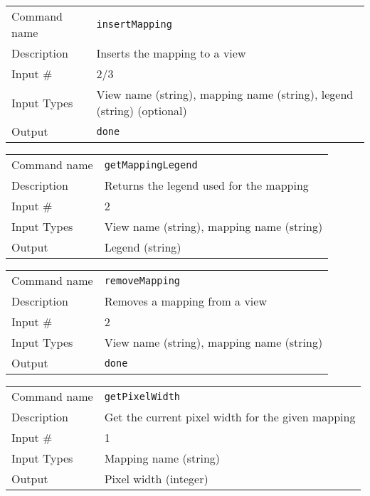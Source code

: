\bigskip

\noindent
\begin{tabular}{l|p{5in}}
\hline
Command name & {\tt insertMapping} \\
Description  & Inserts the mapping to a view \\
Input \#     & 2/3 \\
Input Types  & View name (string), mapping name (string), legend (string)
               (optional) \\
Output       & {\tt done} \\
\hline
\end{tabular}

\bigskip

\noindent
\begin{tabular}{l|p{5in}}
\hline
Command name & {\tt getMappingLegend} \\
Description  & Returns the legend used for the mapping \\
Input \#     & 2 \\
Input Types  & View name (string), mapping name (string) \\
Output       & Legend (string) \\
\hline
\end{tabular}

\bigskip

\noindent
\begin{tabular}{l|p{5in}}
\hline
Command name & {\tt removeMapping} \\
Description  & Removes a mapping from a view \\
Input \#     & 2 \\
Input Types  & View name (string), mapping name (string) \\
Output       & {\tt done} \\
\hline
\end{tabular}

\bigskip

\noindent
\begin{tabular}{l|p{5in}}
\hline
Command name & {\tt getPixelWidth} \\
Description  & Get the current pixel width for the given mapping \\
Input \#     & 1 \\
Input Types  & Mapping name (string) \\
Output       & Pixel width (integer) \\
\hline
\end{tabular}

\bigskip

